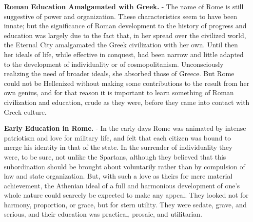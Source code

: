 \documentclass[]{book}
\begin{document}
\textbf{Roman Education Amalgamated with Greek.} - The name of Rome is still suggestive of power and organization. These characteristics seem to have been innate; but the significance of Roman development to the history of progress and education was largely due to the fact that, in her spread over the civilized world, the Eternal City amalgamated the Greek civilization with her own. Until then her ideals of life, while effective in conquest, had been narrow and little adapted to the development of individuality or of cosmopolitanism. Unconsciously realizing the need of broader ideals, she absorbed those of Greece. But Rome could not be Hellenized without making some contributions to the result from her own genius, and for that reason it is important to learn something of Roman civilization and education, crude as they were, before they came into contact with Greek culture.

\textbf{Early Education in Rome.} - In the early days Rome was animated by intense patriotism and love for military life, and felt that each citizen was bound to merge his identity in that of the state. In the surrender of individuality they were, to be sure, not unlike the Spartans, although they believed that this subordination should be brought about voluntarily rather than by compulsion of law and state organization. But, with such a love as theirs for mere material achievement, the Athenian ideal of a full and harmonious development of one's whole nature could scarcely be expected to make any appeal. They looked not for harmony, proportion, or grace, but for stern utility. They were sedate, grave, and serious, and their education was practical, prosaic, and utilitarian.
\end{document}
